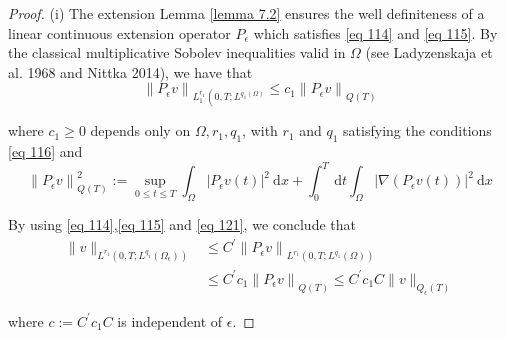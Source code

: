 \begin{proof}
(i) The extension Lemma \eqref{lemma 7.2} ensures the well definiteness of a linear continuous extension operator $P_{\epsilon}$ which satisfies \eqref{eq 114} and \eqref{eq 115}. By the classical multiplicative Sobolev inequalities valid in $\Omega$ (see Ladyzenskaja et al. 1968 and Nittka 2014), we have that
\begin{equation}
  \left\|P_{\epsilon} v\right\|_{L_{1}^{r_{1}}\left(0, T ; L^{q_{1}(\Omega)}\right.} \leq c_{1}\left\|P_{\epsilon} v\right\|_{Q(T)}
\label{eq 121}\end{equation}


where $c_{1} \geq 0$ depends only on $\Omega, r_{1}, q_{1}$, with $r_{1}$ and $q_{1}$ satisfying the conditions \eqref{eq 116} and
\begin{equation}
  \left\|P_{\epsilon} v\right\|_{Q(T)}^{2}:=\sup _{0 \leq t \leq T} \int_{\Omega}\left|P_{\epsilon} v(t)\right|^{2} \mathrm{~d} x+\int_{0}^{T} \mathrm{~d} t \int_{\Omega}\left|\nabla\left(P_{\epsilon} v(t)\right)\right|^{2} \mathrm{~d} x
\label{eq 122}\end{equation}

By using \eqref{eq 114},\eqref{eq 115} and \eqref{eq 121}, we conclude that
\begin{equation}
  \begin{aligned}
\|v\|_{L^{r_{1}}\left(0, T ; L^{q_{1}}\left(\Omega_{\epsilon}\right)\right)} & \leq C^{\prime}\left\|P_{\epsilon} v\right\|_{L^{r_{1}}\left(0, T ; L^{q_{1}}(\Omega)\right)} \\
& \leq C^{\prime} c_{1}\left\|P_{\epsilon} v\right\|_{Q(T)} \leq C^{\prime} c_{1} C\|v\|_{Q_{\epsilon}(T)}
\end{aligned}
\label{eq 123}\end{equation}


where $c:=C^{\prime} c_{1} C$ is independent of $\epsilon$.


\end{proof}
